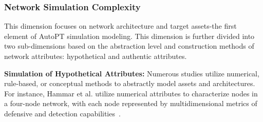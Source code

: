 

\subsubsection{Network Simulation Complexity}

This dimension focuses on network architecture and target assets-the first element of AutoPT simulation modeling. This dimension is further divided into two sub-dimensions based on the abstraction level and construction methods of network attributes: hypothetical and authentic attributes. 

\textbf{Simulation of Hypothetical Attributes:} Numerous studies utilize numerical, rule-based, or conceptual methods to abstractly model assets and architectures. For instance, Hammar et al. utilize numerical attributes to characterize nodes in a four-node network, with each node represented by multidimensional metrics of defensive and detection capabilities~\cite{2020Finding}. 





